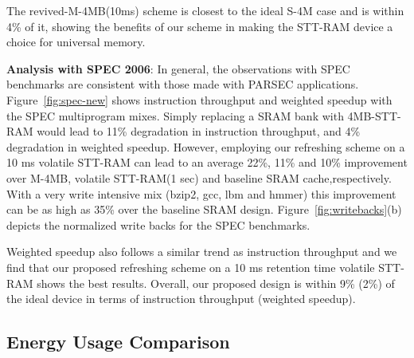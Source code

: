 The revived-M-4MB(10ms) scheme is closest to the ideal S-4M case and is within 4\% of it, showing the benefits of our scheme in making the STT-RAM device a choice for universal memory.

\begin{figure*} [t]
\centering
 \caption{\label{fig:spec-new} Normalized Average Instruction Throughput(IT) and Weighted Speedup(WS) for SPEC 2006 multiprogrammed mixes. }
\end{figure*}

{\bf Analysis with SPEC 2006}: In general, the observations with SPEC benchmarks are consistent with those made with PARSEC applications. Figure~\ref{fig:spec-new} shows instruction throughput and weighted speedup with the  SPEC multiprogram
mixes. Simply replacing a SRAM bank with 4MB-STT-RAM would lead to 11\% degradation in instruction throughput, and 4\% degradation in weighted speedup. However, employing our refreshing scheme on a 10 ms volatile STT-RAM can lead to an average 22\%, 11\%  and 10\% improvement over M-4MB, volatile STT-RAM(1 sec) and baseline SRAM cache,respectively. With a very write intensive mix (bzip2, gcc, lbm and hmmer) this improvement can be as high as 35\% over the baseline SRAM design. Figure~\ref{fig:writebacks}(b) depicts the normalized write backs for
the SPEC benchmarks.


Weighted speedup also follows a similar trend as instruction throughput and we find that our proposed refreshing scheme on a 10 ms retention time volatile STT-RAM shows the best results. Overall, our proposed design is within 9\% (2\%) of the ideal device in terms of instruction throughput (weighted speedup).

\subsection{Energy Usage Comparison}

